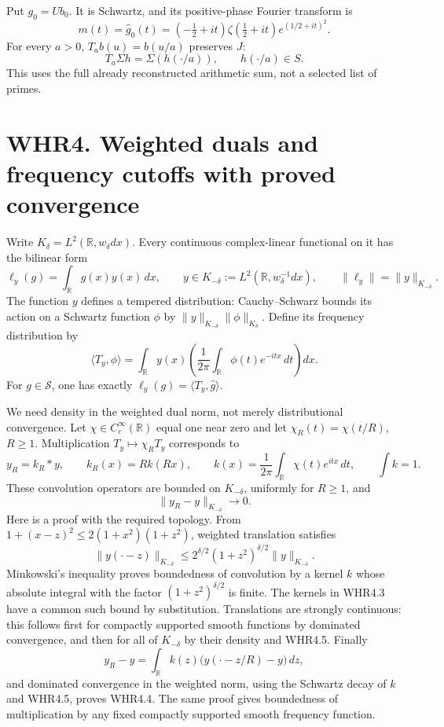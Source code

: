 Put \(g_0=Ub_0\). It is Schwartz, and its positive-phase Fourier
transform is \[
 m(t)=\widehat g_0(t)
 =(-\tfrac12+it)\zeta(\tfrac12+it)e^{(1/2+it)^2}.
 \tag{WHR3.5}
\] For every \(a>0\), \(T_ab(u)=b(u/a)\) preserves \(J\): \[
 T_a\Sigma h=\Sigma(h(\cdot/a)),\qquad h(\cdot/a)\in S.
 \tag{WHR3.6}
\] This uses the full already reconstructed arithmetic sum, not a
selected list of primes.

\section{WHR4. Weighted duals and frequency cutoffs with proved
convergence}\label{whr4.-weighted-duals-and-frequency-cutoffs-with-proved-convergence}

Write \(K_\delta=L^2(\mathbb R,w_\delta dx)\). Every continuous
complex-linear functional on it has the bilinear form \[
 \ell_y(g)=\int_{\mathbb R}g(x)y(x)\,dx,
 \qquad y\in K_{-\delta}:=L^2(\mathbb R,w_\delta^{-1}dx),
 \qquad \|\ell_y\|=\|y\|_{K_{-\delta}}.
 \tag{WHR4.1}
\] The function \(y\) defines a tempered distribution: Cauchy--Schwarz
bounds its action on a Schwartz function \(\phi\) by
\(\|y\|_{K_{-\delta}}\|\phi\|_{K_\delta}\). Define its frequency
distribution by \[
 \langle T_y,\phi\rangle
 =\int_{\mathbb R}y(x)\left(\frac1{2\pi}
                  \int_{\mathbb R}\phi(t)e^{-itx}\,dt\right)dx.
 \tag{WHR4.2}
\] For \(g\in\mathcal S\), one has exactly
\(\ell_y(g)=\langle T_y,\widehat g\rangle\).

We need density in the weighted dual norm, not merely distributional
convergence. Let \(\chi\in C_c^\infty(\mathbb R)\) equal one near zero
and let \(\chi_R(t)=\chi(t/R)\), \(R\geq1\). Multiplication
\(T_y\mapsto\chi_RT_y\) corresponds to \[
 y_R=k_R*y,\qquad
 k_R(x)=Rk(Rx),\qquad
 k(x)=\frac1{2\pi}\int_{\mathbb R}\chi(t)e^{itx}\,dt,
 \qquad\int k=1.
 \tag{WHR4.3}
\] These convolution operators are bounded on \(K_{-\delta}\), uniformly
for \(R\geq1\), and \[
 \|y_R-y\|_{K_{-\delta}}\longrightarrow0.
 \tag{WHR4.4}
\] Here is a proof with the required topology. From
\(1+(x-z)^2\leq2(1+x^2)(1+z^2)\), weighted translation satisfies \[
 \|y(\cdot-z)\|_{K_{-\delta}}
 \leq2^{\delta/2}(1+z^2)^{\delta/2}\|y\|_{K_{-\delta}}.
 \tag{WHR4.5}
\] Minkowski's inequality proves boundedness of convolution by a kernel
\(k\) whose absolute integral with the factor \((1+z^2)^{\delta/2}\) is
finite. The kernels in WHR4.3 have a common such bound by substitution.
Translations are strongly continuous: this follows first for compactly
supported smooth functions by dominated convergence, and then for all of
\(K_{-\delta}\) by their density and WHR4.5. Finally \[
 y_R-y=\int_{\mathbb R}k(z)
                    \bigl(y(\cdot-z/R)-y\bigr)\,dz,
\] and dominated convergence in the weighted norm, using the Schwartz
decay of \(k\) and WHR4.5, proves WHR4.4. The same proof gives
boundedness of multiplication by any fixed compactly supported smooth
frequency function.

